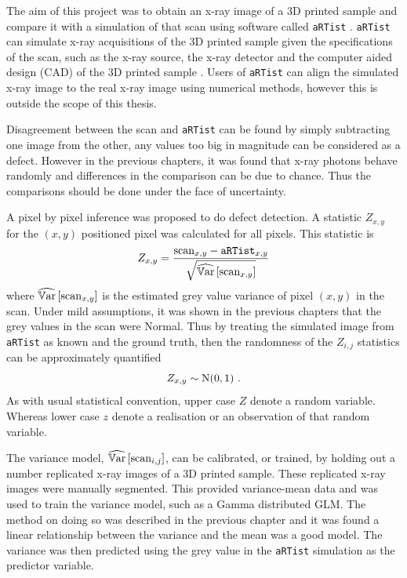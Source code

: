 The aim of this project was to obtain an x-ray image of a 3D printed sample and compare it with a simulation of that scan using software called \texttt{aRTist} \citep{bellon2007artist, jaenisch2008artist, bellon2012radiographic}. \texttt{aRTist} can simulate x-ray acquisitions of the 3D printed sample given the specifications of the scan, such as the x-ray source, the x-ray detector and the computer aided design (CAD) of the 3D printed sample \citep{bellon2011simulation, deresch2012simulating}. Users of \texttt{aRTist} can align the simulated x-ray image to the real x-ray image using numerical methods, however this is outside the scope of this thesis.

Disagreement between the scan and \texttt{aRTist} can be found by simply subtracting one image from the other, any values too big in magnitude can be considered as a defect. However in the previous chapters, it was found that x-ray photons behave randomly and differences in the comparison can be due to chance. Thus the comparisons should be done under the face of uncertainty.

A pixel by pixel inference was proposed to do defect detection. A statistic $Z_{x,y}$ for the $(x,y)$ positioned pixel was calculated for all pixels. This statistic is
\begin{equation}
    Z_{x,y} = 
    \dfrac{
        \text{scan}_{x,y} - \texttt{aRTist}_{x,y}
    }
    {
        \sqrt{\widehat{\operatorname{\mathbb{V}ar}}\left[\text{scan}_{x,y}\right]}
    }
\end{equation}
where $\widehat{\operatorname{\mathbb{V}ar}}\left[\text{scan}_{x,y}\right]$ is the estimated grey value variance of pixel $(x,y)$ in the scan. Under mild assumptions, it was shown in the previous chapters that the grey values in the scan were Normal. Thus by treating the simulated image from \texttt{aRTist} as known and the ground truth, then the randomness of the $Z_{i,j}$ statistics can be approximately quantified
\begin{equation}
Z_{x,y}\sim \operatorname{N}(0,1) \ .
\end{equation}
As with usual statistical convention, upper case $Z$ denote a random variable. Whereas lower case $z$ denote a realisation or an observation of that random variable.

The variance model, $\widehat{\operatorname{\mathbb{V}ar}}\left[\text{scan}_{i,j}\right]$, can be calibrated, or trained, by holding out a number replicated x-ray images of a 3D printed sample. These replicated x-ray images were manually segmented. This provided variance-mean data and was used to train the variance model, such as a Gamma distributed GLM. The method on doing so was described in the previous chapter and it was found a linear relationship between the variance and the mean was a good model. The variance was then predicted using the grey value in the \texttt{aRTist} simulation as the predictor variable.

